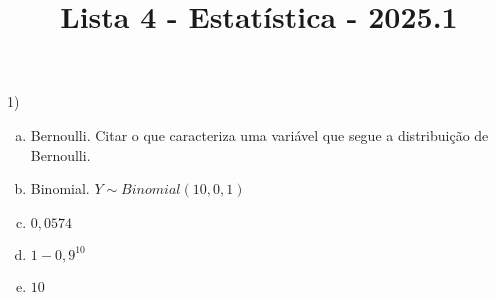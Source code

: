 \documentclass{article}
\title{Lista 4 - Estatística - 2025.1}
\begin{document}
\date{}
\maketitle

1) 
\begin{enumerate}[a)]
    \item Bernoulli. Citar o que caracteriza uma variável que segue a distribuição de Bernoulli.
    \item Binomial. $Y\sim Binomial(10, 0,1)$
    \item $0,0574$
    \item $1 - 0,9^{10}$
    \item $10$
\end{enumerate}

\vspace{5px}
\end{document}
